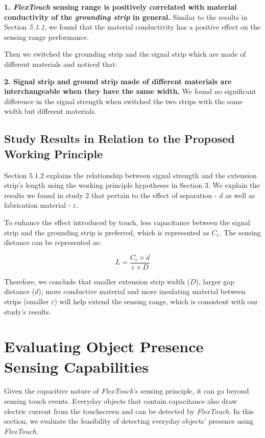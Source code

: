\textbf{1. \textit{FlexTouch} sensing range is positively correlated with material conductivity of the \textit{grounding strip} in general.} Similar to the results in Section \textit{5.1.1}, we found that the material conductivity has a positive effect on the sensing range performance.

Then we switched the grounding strip and the signal strip which are made of different materials and noticed that:
 
\textbf{2. Signal strip and ground strip made of different materials are interchangeable when they have the same width.} We found no significant difference in the signal strength when switched the two strips with the same width but different materials. 

\subsection{Study Results in Relation to the Proposed Working Principle }
Section $5.1.2$ explains the relationship between signal strength and the extension strip's length using the working principle hypotheses in Section $3$. We explain the results we found in study 2 that pertain to the effect of separation - $d$ as well as fabrication material - $\varepsilon$.

To enhance the effect introduced by touch, less capacitance between the signal strip and the grounding strip is preferred, which is represented as $C_{e}$. The sensing distance can be represented as: 

\begin{equation}
    L = \frac{C_{e} \times d}{\varepsilon \times D}
\end{equation}

Therefore, we conclude that smaller extension strip width ($D$), larger gap distance ($d$), more conductive material and more insulating material between strips (smaller $\varepsilon$) will help extend the sensing range, which is consistent with our study's results.

\section{Evaluating Object Presence Sensing Capabilities}
Given the capacitive nature of \textit{FlexTouch}'s sensing principle, it can go beyond sensing touch events. Everyday objects that contain capacitance also draw electric current from the touchscreen and can be detected by \textit{FlexTouch}. In this section, we evaluate the feasibility of detecting everyday objects' presence using \textit{FlexTouch}. 

